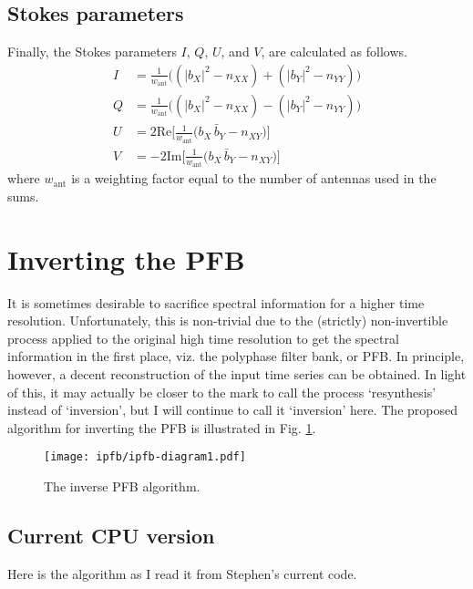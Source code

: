 \documentclass{article}
\begin{document}
\subsection{Stokes parameters}

Finally, the Stokes parameters $I$, $Q$, $U$, and $V$, are calculated as follows.
\begin{align}
    I &= \frac{1}{w_\text{ant}}\bigg((|b_X|^2 - n_{XX}) + (|b_Y|^2 - n_{YY})\bigg) \\
    Q &= \frac{1}{w_\text{ant}}\bigg((|b_X|^2 - n_{XX}) - (|b_Y|^2 - n_{YY})\bigg) \\
    U &=  2 \text{Re}\bigg[\frac{1}{w_\text{ant}}\bigg(b_X\,\bar{b}_Y - n_{XY}\bigg)\bigg]\\
    V &= -2 \text{Im}\bigg[\frac{1}{w_\text{ant}}\bigg(b_X\,\bar{b}_Y - n_{XY}\bigg)\bigg]
\end{align}
where $w_\text{ant}$ is a weighting factor equal to the number of antennas used in the sums.

\newpage
\section{Inverting the PFB}

It is sometimes desirable to sacrifice spectral information for a higher time resolution.
Unfortunately, this is non-trivial due to the (strictly) non-invertible process applied to the original high time resolution to get the spectral information in the first place, viz. the polyphase filter bank, or PFB.
In principle, however, a decent reconstruction of the input time series can be obtained.
In light of this, it may actually be closer to the mark to call the process `resynthesis' instead of `inversion', but I will continue to call it `inversion' here.
The proposed algorithm for inverting the PFB is illustrated in Fig. \ref{fig:ipfb}.

\begin{figure}[!p]
    \centering
    \texttt{[image: ipfb/ipfb-diagram1.pdf]}
    \caption{The inverse PFB algorithm.}
    \label{fig:ipfb}
\end{figure}

\subsection{Current CPU version}

Here is the algorithm as I read it from Stephen's current code.

\newcommand{\blue}[1]{{\color{blue}#1}}
\newcommand{\red}[1]{{\color{red}#1}}
\newcommand{\arrsize}[1]{{\color{red}[}#1{\color{red}]}}
\newcommand{\vrbl}[1]{{\texttt{\blue{#1}}}}
\end{document}
